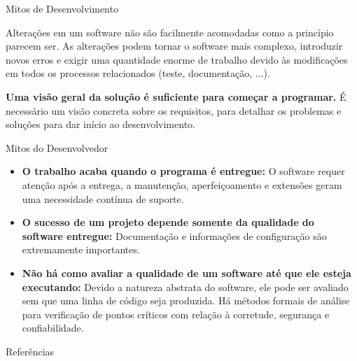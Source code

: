 \begin{frame}{Mitos de Desenvolvimento}

\begin{description}[<+-| alert@+>]
\item[Alterações são fáceis:] Alterações em um software não são
  facilmente acomodadas como a princípio parecem ser. As alterações
  podem tornar o software mais complexo, introduzir novos erros e
  exigir uma quantidade enorme de trabalho devido às modificações em
  todos os processos relacionados (teste, documentação, $\ldots$).

\item[Visão superficial:] {\bf Uma visão geral da solução é suficiente
    para começar a programar.} É necessário um visão concreta sobre os
  requisitos, para detalhar os problemas e soluções para dar início ao
  desenvolvimento.
\end{description}

\end{frame}

\begin{frame}{Mitos do Desenvolvedor}

\begin{itemize}[<+-| alert@+>]
\item {\bf O trabalho acaba quando o programa é entregue:} O software requer
  atenção após a entrega, a manutenção, aperfeiçoamento e extensões
  geram uma necessidade contínua de suporte.
\item {\bf O sucesso de um projeto depende somente da qualidade do software
  entregue:} Documentação e informações de configuração são
  extremamente importantes.
\item {\bf Não há como avaliar a qualidade de um software até que ele
  esteja executando:} Devido a natureza abstrata do software, ele pode
  ser avaliado sem que uma linha de código seja produzida. Há métodos
  formais de análise para verificação de pontos críticos com relação à
  corretude, segurança e confiabilidade.
\end{itemize}

\end{frame}

\begin{frame}{Referências}


\end{frame}


